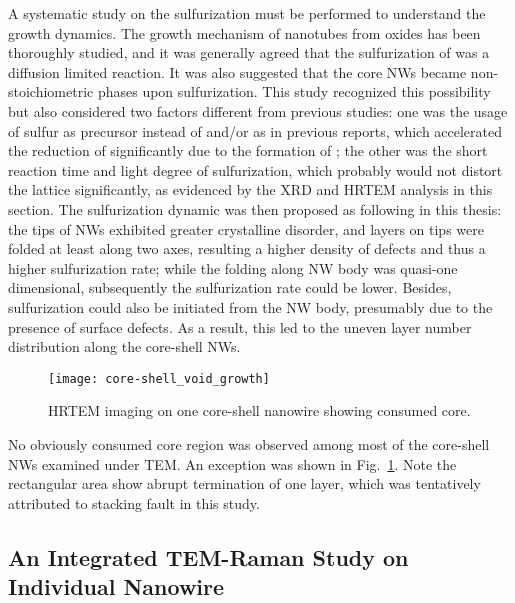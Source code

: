 A systematic study on the sulfurization must be performed to understand the growth dynamics. The growth mechanism of  nanotubes from oxides has been thoroughly studied,\cite{Feldman1998} and it was generally agreed that the sulfurization of  was a diffusion limited reaction.\cite{Feldman1996} It was also suggested that the core  NWs became non-stoichiometric phases upon sulfurization.\cite{Feldman1996,ZAK2009} This study recognized this possibility but also considered two factors different from previous studies: one was the usage of sulfur as precursor instead of  and/or  as in previous reports, which accelerated the reduction of  significantly due to the formation of ; the other was the short reaction time and light degree of sulfurization, which probably would not distort the  lattice significantly, as evidenced by the XRD and HRTEM analysis in this section. The sulfurization dynamic was then proposed as following in this thesis: the tips of  NWs exhibited greater crystalline disorder, and  layers on tips were folded at least along two axes, resulting a higher density of defects and thus a higher sulfurization rate; while the folding along NW body was quasi-one dimensional, subsequently the sulfurization rate could be lower. Besides, sulfurization could also be initiated from the NW body, presumably due to the presence of surface defects. As a result, this led to the uneven  layer number distribution along the core-shell NWs.

\begin{figure}[htb]
\centering
\texttt{[image: core-shell\_void\_growth]}
\caption[HRTEM imaging on one nanowire showing consumed core]{HRTEM imaging on one core-shell nanowire showing consumed core.}
\label{fig:ch5ws2tem2}
\end{figure}
No obviously consumed core region was observed among most of the core-shell NWs examined under TEM. An exception was shown in Fig.~\ref{fig:ch5ws2tem2}. Note the rectangular area show abrupt termination of one  layer, which was tentatively attributed to stacking fault in this study.


\subsection{An Integrated TEM-Raman Study on Individual Nanowire}\label{tms:raman} 

